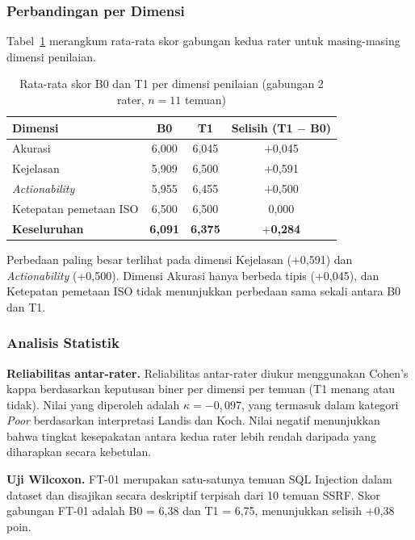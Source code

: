 \subsubsection{Perbandingan per Dimensi}

Tabel~\ref{tab:validasi-dimensi} merangkum rata-rata skor gabungan
kedua rater untuk masing-masing dimensi penilaian.

\begin{table}[h]
\caption{Rata-rata skor B0 dan T1 per dimensi penilaian
(gabungan 2 rater, $n=11$ temuan)}
\vspace{0.5em}
\centering
\label{tab:validasi-dimensi}
\begin{tabular}{|l|c|c|c|}
\hline
\textbf{Dimensi} & \textbf{B0} & \textbf{T1} &
  \textbf{Selisih (T1 $-$ B0)} \\
\hline \hline
Akurasi & 6{,}000 & 6{,}045 & $+$0{,}045 \\
\hline
Kejelasan & 5{,}909 & 6{,}500 & $+$0{,}591 \\
\hline
\textit{Actionability} & 5{,}955 & 6{,}455 & $+$0{,}500 \\
\hline
Ketepatan pemetaan ISO & 6{,}500 & 6{,}500 & \phantom{$+$}0{,}000 \\
\hline
\textbf{Keseluruhan} & \textbf{6{,}091} & \textbf{6{,}375} &
  $\mathbf{+}$\textbf{0{,}284} \\
\hline
\end{tabular}
\end{table}

Perbedaan paling besar terlihat pada dimensi Kejelasan (+0,591) dan
\textit{Actionability} (+0,500). Dimensi Akurasi hanya berbeda tipis
(+0,045), dan Ketepatan pemetaan ISO tidak menunjukkan perbedaan
sama sekali antara B0 dan T1.

\subsubsection{Analisis Statistik}

\textbf{Reliabilitas antar-rater.}
Reliabilitas antar-rater diukur menggunakan Cohen's kappa berdasarkan
keputusan biner per dimensi per temuan (T1 menang atau tidak). Nilai
yang diperoleh adalah $\kappa = {-0{,}097}$, yang termasuk dalam
kategori \textit{Poor} berdasarkan interpretasi Landis dan Koch.
Nilai negatif menunjukkan bahwa tingkat kesepakatan antara kedua
rater lebih rendah daripada yang diharapkan secara kebetulan.

\textbf{Uji Wilcoxon.}
FT-01 merupakan satu-satunya temuan SQL Injection dalam dataset dan
disajikan secara deskriptif terpisah dari 10 temuan SSRF. Skor
gabungan FT-01 adalah B0 = 6,38 dan T1 = 6,75, menunjukkan selisih
+0,38 poin.

